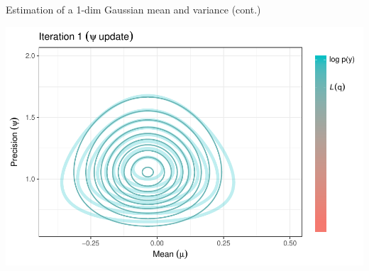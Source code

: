 \begin{frame}{Estimation of a 1-dim Gaussian mean and variance (cont.)}
{\begin{center}
      \includegraphics[scale=0.7]{figure/vbupdate_2}
    \end{center}
  } 
  

\end{frame}

